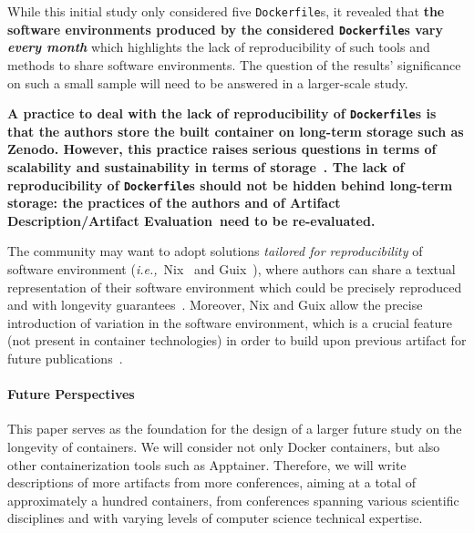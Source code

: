 \documentclass[sigconf,natbib=false]{acmart}
\newcommand{\ie}{\emph{i.e.,}}
\newcommand{\ad}{Artifact Description}
\newcommand{\aeval}{Artifact Evaluation}
\newcommand{\adae}{\ad/\aeval}
\newcommand{\df}{\texttt{Dockerfile}}
\begin{document}
While this initial study only considered five \df s, it revealed that \textbf{the software environments produced by the considered \df s vary \emph{every month}} which highlights the lack of reproducibility of such tools and methods to share software environments.
The question of the results' significance on such a small sample will need to be answered in a larger-scale study.

\textbf{
  A practice to deal with the lack of reproducibility of \df s is that the authors store the built container on long-term storage such as Zenodo.
  However, this practice raises serious questions in terms of scalability and sustainability in terms of storage~\cite{monroe2023preservation}.
  The lack of reproducibility of \df s should not be hidden behind long-term storage: the practices of the authors and of \adae\ need to be re-evaluated.
}

The community may want to adopt solutions \emph{tailored for reproducibility} of software environment (\ie\ Nix~\cite{dolstra_nix_2004} and Guix~\cite{courtes_functional_2013}), where authors can share a textual representation of their software environment which could be precisely reproduced and with longevity guarantees~\cite{courtes2024source}.
Moreover, Nix and Guix allow the precise introduction of variation in the software environment, which is a crucial feature (not present in container technologies) in order to build upon previous artifact for future publications~\cite{mercier2018considering}.

\paragraph{Future Perspectives}

This paper serves as the foundation for the design of a larger future study on the longevity of containers. 
We will consider not only Docker containers, but also other containerization tools such as Apptainer.
Therefore, we will write descriptions of more artifacts from more conferences, aiming at a total of approximately a hundred containers, from conferences spanning various scientific disciplines and with varying levels of computer science technical expertise.
\end{document}
